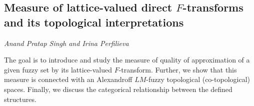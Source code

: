\documentclass[../booklet.tex]{subfiles}
\begin{document}
\subsection[Measure of lattice-valued direct $F$-transforms and its topological interpretations. {\it Anand Pratap Singh and Irina Perfilieva}]{Measure of lattice-valued direct $F$-transforms and its topological interpretations}
 

\begin{center}
  {\it Anand Pratap Singh and Irina Perfilieva}
\end{center}



		The goal is to introduce and study the measure of quality of approximation of a given fuzzy set by its lattice-valued $F$-transform. Further, we show that this measure is connected with an Alexandroff $LM$-fuzzy topological (co-topological) spaces. Finally, we discuss the categorical relationship between the defined structures.
		
	
\end{document}
